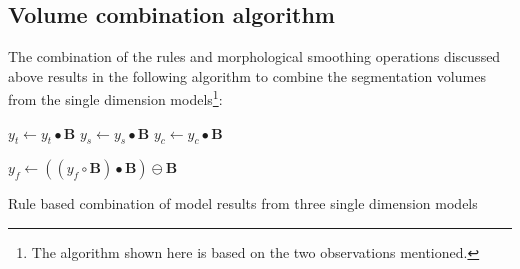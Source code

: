 \subsection{Volume combination algorithm}
The combination of the rules and morphological smoothing operations discussed above results in the following algorithm to combine the segmentation volumes from the single dimension models\footnote{
    The algorithm shown here is based on the two observations mentioned.
}:

\begin{algorithm}[H]
    \SetAlgoLined
    $y_t \leftarrow y_t \bullet \mathbf{B}$ \;
    $y_s \leftarrow y_s \bullet \mathbf{B}$ \;
    $y_c \leftarrow y_c \bullet \mathbf{B}$ \;
    
    $y_f \leftarrow ((y_f \circ \mathbf{B}) \bullet \mathbf{B}) \ominus \mathbf{B}$
   \caption{Rule based combination of model results from three single dimension models\label{alg:combination}}
\end{algorithm}